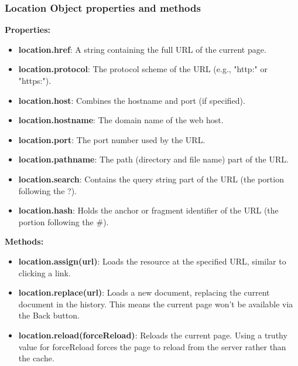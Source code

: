 \documentclass{report}
\begin{document}
    \subsubsection{Location Object properties and methods}
    \bigbreak \noindent 
    \textbf{Properties:}
    \begin{itemize}
        \item \textbf{location.href}: A string containing the full URL of the current page.
        \item \textbf{location.protocol}: The protocol scheme of the URL (e.g., "http:" or "https:").
        \item \textbf{location.host}: Combines the hostname and port (if specified).
        \item \textbf{location.hostname}: The domain name of the web host.
        \item \textbf{location.port}: The port number used by the URL.
        \item \textbf{location.pathname}: The path (directory and file name) part of the URL.
        \item \textbf{location.search}: Contains the query string part of the URL (the portion following the ?).
        \item \textbf{location.hash}: Holds the anchor or fragment identifier of the URL (the portion following the #).
    \end{itemize}
    \bigbreak \noindent 
    \textbf{Methods:}
    \begin{itemize}
        \item \textbf{location.assign(url)}: Loads the resource at the specified URL, similar to clicking a link.
        \item \textbf{location.replace(url)}: Loads a new document, replacing the current document in the history. This means the current page won’t be available via the Back button.
        \item \textbf{location.reload(forceReload)}: Reloads the current page. Using a truthy value for forceReload forces the page to reload from the server rather than the cache.
    \end{itemize}

    \bigbreak \noindent 
\end{document}
